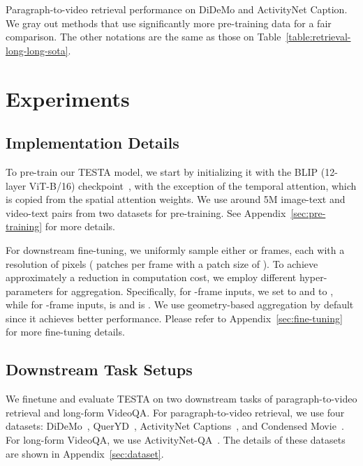 \documentclass[11pt]{article}
\newcommand{\modelname}{TESTA\xspace}
\begin{document}
\begin{table*}[t!]
\begin{adjustbox}{max width=\linewidth}
\end{adjustbox}
\caption{Paragraph-to-video retrieval performance on DiDeMo and ActivityNet Caption. We gray out methods that use significantly more pre-training data for a fair comparison. The other notations are the same as those on Table~\ref{table:retrieval-long-long-sota}. }
\label{table:retrieval-long-sota}
\end{table*}
 
\section{Experiments}

\subsection{Implementation Details}
To pre-train our \modelname model, we start by initializing it with the BLIP (12-layer ViT-B/16) checkpoint~\citep{Li2022BLIPBL}, with the exception of the temporal attention, which is copied from the spatial attention weights. 
We use around 5M image-text and video-text pairs from two datasets for pre-training. 
See Appendix~\ref{sec:pre-training} for more details.~ 


For downstream fine-tuning, we uniformly sample either  or  frames, each with a resolution of  pixels ( patches per frame with a patch size of ). 
To achieve approximately a  reduction in computation cost, we employ different hyper-parameters for aggregation.
Specifically, for -frame inputs, we set  to  and  to , while for -frame inputs,  is  and  is . 
We use geometry-based aggregation by default since it achieves better performance. 
Please refer to Appendix~\ref{sec:fine-tuning} for more fine-tuning details. 


\subsection{Downstream Task Setups}
We finetune and evaluate \modelname on two downstream tasks of paragraph-to-video retrieval and long-form VideoQA. 
For paragraph-to-video retrieval, we use four datasets: DiDeMo~\citep{Hendricks2017LocalizingMI}, QuerYD~\citep{Oncescu2020QUERYDAV}, ActivityNet Captions~\citep{Krishna2017DenseCaptioningEI}, and Condensed Movie~\cite{Bain2020CondensedMS}.
For long-form VideoQA, we use ActivityNet-QA~\citep{Yu2019ActivityNetQAAD}. 
The details of these datasets are shown in Appendix~\ref{sec:dataset}. 
\end{document}
